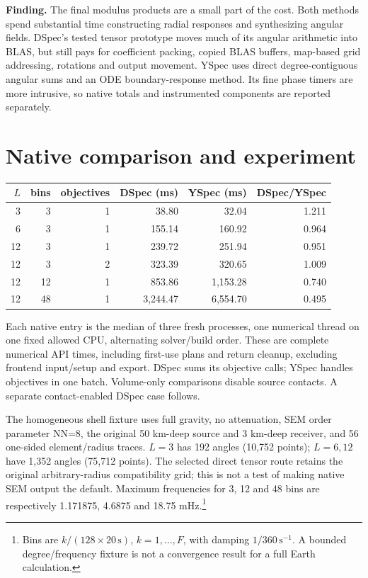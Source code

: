 \textbf{Finding.} The final modulus products are a small part of the cost. Both methods spend substantial time constructing radial responses and synthesizing angular fields. DSpec's tested tensor prototype moves much of its angular arithmetic into BLAS, but still pays for coefficient packing, copied BLAS buffers, map-based grid addressing, rotations and output movement. YSpec uses direct degree-contiguous angular sums and an ODE boundary-response method. Its fine phase timers are more intrusive, so native totals and instrumented components are reported separately.
\section{Native comparison and experiment}
\begin{center}\begin{tabular}{rrrrrr}\toprule
$L$ & bins & objectives & DSpec (ms) & YSpec (ms) & DSpec/YSpec\\\midrule
3 & 3 & 1 & 38.80 & 32.04 & 1.211\\
6 & 3 & 1 & 155.14 & 160.92 & 0.964\\
12 & 3 & 1 & 239.72 & 251.94 & 0.951\\
12 & 3 & 2 & 323.39 & 320.65 & 1.009\\
12 & 12 & 1 & 853.86 & 1,153.28 & 0.740\\
12 & 48 & 1 & 3,244.47 & 6,554.70 & 0.495\\
\bottomrule\end{tabular}\end{center}
Each native entry is the median of three fresh processes, one numerical thread on one fixed allowed CPU, alternating solver/build order. These are complete numerical API times, including first-use plans and return cleanup, excluding frontend input/setup and export. DSpec sums its objective calls; YSpec handles objectives in one batch. Volume-only comparisons disable source contacts. A separate contact-enabled DSpec case follows.

The homogeneous shell fixture uses full gravity, no attenuation, SEM order parameter NN=8, the original 50 km-deep source and 3 km-deep receiver, and 56 one-sided element/radius traces. $L=3$ has 192 angles (10,752 points); $L=6,12$ have 1,352 angles (75,712 points). The selected direct tensor route retains the original arbitrary-radius compatibility grid; this is not a test of making native SEM output the default. Maximum frequencies for 3, 12 and 48 bins are respectively 1.171875, 4.6875 and 18.75 mHz.\footnote{Bins are $k/(128\times20\,\mathrm{s})$, $k=1,\ldots,F$, with damping $1/360\,\mathrm{s}^{-1}$. A bounded degree/frequency fixture is not a convergence result for a full Earth calculation.}

